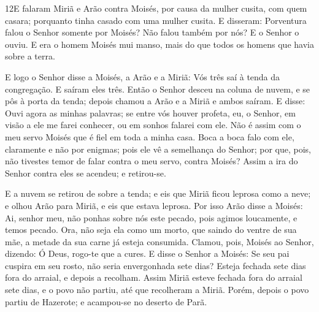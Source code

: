 \medskip

\lettrine{12} E falaram Miriã e Arão contra Moisés, por causa
da mulher cusita, com quem casara; porquanto tinha casado com uma
mulher cusita. E disseram: Porventura falou o Senhor somente por
Moisés? Não falou também por nós? E o Senhor o ouviu. E era o
homem Moisés mui manso, mais do que todos os homens que havia sobre
a terra.

E logo o Senhor disse a Moisés, a Arão e a Miriã: Vós três saí à
tenda da congregação. E saíram eles três. Então o Senhor desceu
na coluna de nuvem, e se pôs à porta da tenda; depois chamou a Arão
e a Miriã e ambos saíram. E disse: Ouvi agora as minhas
palavras; se entre vós houver profeta, eu, o Senhor, em visão a ele
me farei conhecer, ou em sonhos falarei com ele. Não é assim com
o meu servo Moisés que é fiel em toda a minha casa. Boca a boca
falo com ele, claramente e não por enigmas; pois ele vê a semelhança
do Senhor; por que, pois, não tivestes temor de falar contra o meu
servo, contra Moisés? Assim a ira do Senhor contra eles se
acendeu; e retirou-se.

E a nuvem se retirou de sobre a tenda; e eis que Miriã ficou
leprosa como a neve; e olhou Arão para Miriã, e eis que estava
leprosa. Por isso Arão disse a Moisés: Ai, senhor meu, não
ponhas sobre nós este pecado, pois agimos loucamente, e temos
pecado. Ora, não seja ela como um morto, que saindo do ventre
de sua mãe, a metade da sua carne já esteja consumida.
Clamou, pois, Moisés ao Senhor, dizendo: Ó Deus, rogo-te que
a cures. E disse o Senhor a Moisés: Se seu pai cuspira em seu
rosto, não seria envergonhada sete dias? Esteja fechada sete dias
fora do arraial, e depois a recolham. Assim Miriã esteve
fechada fora do arraial sete dias, e o povo não partiu, até que
recolheram a Miriã. Porém, depois o povo partiu de Hazerote;
e acampou-se no deserto de Parã.

\medskip

